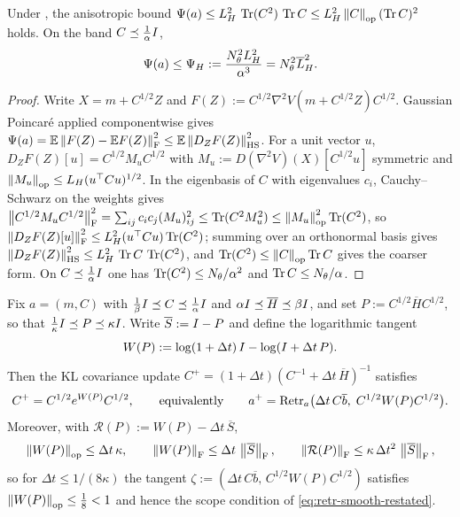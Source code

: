 \begin{lemma}
\label{lem:Psi-hesslip}
Under , the anisotropic bound
$\Psi(a)\leq L_H^2\,\operatorname{Tr}(C^2)\,\operatorname{Tr} C\leq L_H^2\left\lVert C\right\rVert_{\mathrm{op}}(\operatorname{Tr} C)^2$ holds. On the band
$C\preceq\tfrac1\alpha I$,
\begin{equation}
\label{eq:Psi-hesslip}
    \Psi(a)\leq\Psi_H:=\frac{N_\theta^2L_H^2}{\alpha^3}=N_\theta^2\overline{L}_H^2 .
\end{equation}
\end{lemma}

\begin{proof}
Write $X=m+C^{1/2}Z$ and $F(Z):=C^{1/2}\nabla^2V(m+C^{1/2}Z)C^{1/2}$. Gaussian Poincar\'e applied
componentwise gives $\Psi(a)=\mathbb{E}\left\lVert F(Z)-\mathbb{E} F(Z)\right\rVert_{\mathrm{F}}^2\leq\mathbb{E}\left\lVert D_ZF(Z)\right\rVert_{\mathrm{HS}}^2$. For
a unit vector $u$, $D_ZF(Z)[u]=C^{1/2}M_uC^{1/2}$ with $M_u:=D(\nabla^2V)(X)[C^{1/2}u]$ symmetric and
$\left\lVert M_u\right\rVert_{\mathrm{op}}\leq L_H(u^\top Cu)^{1/2}$. In the eigenbasis of $C$ with eigenvalues $c_i$,
Cauchy--Schwarz on the weights gives
$\left\lVert C^{1/2}M_uC^{1/2}\right\rVert_{\mathrm{F}}^2=\sum_{ij}c_ic_j(M_u)_{ij}^2\leq\operatorname{Tr}(C^2M_u^2)\leq\left\lVert M_u\right\rVert_{\mathrm{op}}^2\operatorname{Tr}(C^2)$,
so $\left\lVert D_ZF(Z)[u]\right\rVert_{\mathrm{F}}^2\leq L_H^2(u^\top Cu)\operatorname{Tr}(C^2)$; summing over an orthonormal basis gives
$\left\lVert D_ZF(Z)\right\rVert_{\mathrm{HS}}^2\leq L_H^2\,\operatorname{Tr} C\,\operatorname{Tr}(C^2)$, and $\operatorname{Tr}(C^2)\leq\left\lVert C\right\rVert_{\mathrm{op}}\operatorname{Tr} C$ gives the
coarser form. On $C\preceq\tfrac1\alpha I$ one has $\operatorname{Tr}(C^2)\leq N_\theta/\alpha^2$ and
$\operatorname{Tr} C\leq N_\theta/\alpha$.
\end{proof}

\begin{lemma}
\label{lem:KL-retraction}
Fix $a=(m,C)$ with $\tfrac1\beta I\preceq C\preceq\tfrac1\alpha I$ and
$\alpha I\preceq\overline H\preceq\beta I$, and set $P:=C^{1/2}\overline HC^{1/2}$, so that
$\tfrac1\kappa I\preceq P\preceq\kappa I$. Write $\overline S:=I-P$ and define the logarithmic
tangent
\begin{equation}
\label{eq:Wlog}
    W(P):=\log(1+\Delta t)\,I-\log(I+\Delta t\,P).
\end{equation}
Then the KL covariance update $C^+=(1+\Delta t)(C^{-1}+\Delta t\,\overline H)^{-1}$ satisfies
\begin{equation}
\label{eq:KL-retr}
    C^+=C^{1/2}e^{W(P)}C^{1/2},
    \qquad\text{equivalently}\qquad
    a^+=\operatorname{Retr}_a\bigl(\Delta t\,C\overline b,\;C^{1/2}W(P)C^{1/2}\bigr).
\end{equation}
Moreover, with $\mathcal R(P):=W(P)-\Delta t\,\overline S$,
\begin{equation}
\label{eq:Wlog-bounds}
    \left\lVert W(P)\right\rVert_{\mathrm{op}}\leq\Delta t\,\kappa,
    \qquad
    \left\lVert W(P)\right\rVert_{\mathrm{F}}\leq\Delta t\,\left\lVert \overline S\right\rVert_{\mathrm{F}},
    \qquad
    \left\lVert \mathcal R(P)\right\rVert_{\mathrm{F}}\leq\kappa\,\Delta t^2\,\left\lVert \overline S\right\rVert_{\mathrm{F}},
\end{equation}
so for $\Delta t\leq1/(8\kappa)$ the tangent $\zeta:=(\Delta t\,C\overline b,\,C^{1/2}W(P)C^{1/2})$
satisfies $\left\lVert W(P)\right\rVert_{\mathrm{op}}\leq\tfrac18<1$ and hence the scope condition of
\eqref{eq:retr-smooth-restated}.
\end{lemma}

